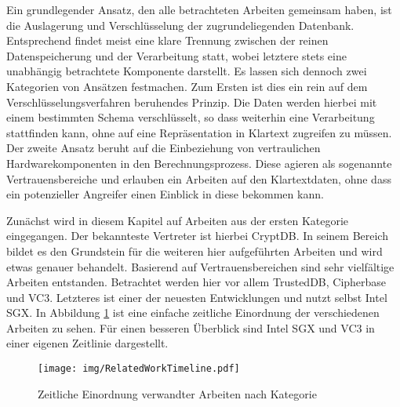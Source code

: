 Ein grundlegender Ansatz, den alle betrachteten Arbeiten gemeinsam haben, ist die Auslagerung und Verschlüsselung der zugrundeliegenden Datenbank. Entsprechend findet meist eine klare Trennung zwischen der reinen Datenspeicherung und der Verarbeitung statt, wobei letztere stets eine unabhängig betrachtete Komponente darstellt. Es lassen sich dennoch zwei Kategorien von Ansätzen festmachen. Zum Ersten ist dies ein rein auf dem Verschlüsselungsverfahren beruhendes Prinzip. Die Daten werden hierbei mit einem bestimmten Schema verschlüsselt, so dass weiterhin eine Verarbeitung stattfinden kann, ohne auf eine Repräsentation in Klartext zugreifen zu müssen. Der zweite Ansatz beruht auf die Einbeziehung von vertraulichen Hardwarekomponenten in den Berechnungsprozess. Diese agieren als sogenannte Vertrauensbereiche und erlauben ein Arbeiten auf den Klartextdaten, ohne dass ein potenzieller Angreifer einen Einblick in diese bekommen kann.

Zunächst wird in diesem Kapitel auf Arbeiten aus der ersten Kategorie eingegangen. Der bekannteste Vertreter ist hierbei CryptDB. In seinem Bereich bildet es den Grundstein für die weiteren hier aufgeführten Arbeiten und wird etwas genauer behandelt. Basierend auf Vertrauensbereichen sind sehr vielfältige Arbeiten entstanden. Betrachtet werden hier vor allem TrustedDB, Cipherbase und VC3. Letzteres ist einer der neuesten Entwicklungen und nutzt selbst Intel SGX. In Abbildung \ref{fig:timeline} ist eine einfache zeitliche Einordnung der verschiedenen Arbeiten zu sehen. Für einen besseren Überblick sind Intel SGX und VC3 in einer eigenen Zeitlinie dargestellt.

\begin{figure}
	\texttt{[image: img/RelatedWorkTimeline.pdf]}
	\centering
	\caption{Zeitliche Einordnung verwandter Arbeiten nach Kategorie}
	\label{fig:timeline}
\end{figure}

